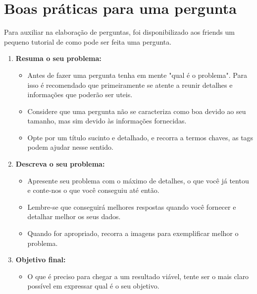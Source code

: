 \chapter{Boas práticas para uma pergunta}
\label{boa-pergunta}
 
Para auxiliar na elaboração de perguntas, foi disponibilizado aos \glspl{friend} um pequeno tutorial de como pode ser feita uma pergunta. 

\begin{enumerate}
\item \textbf{Resuma o seu problema:} 
\begin{itemize}
\item Antes de fazer uma pergunta tenha em mente "qual é o problema". Para isso é recomendado que primeiramente se atente a reunir detalhes e informações que poderão ser uteis.
\item Considere que uma pergunta não se caracteriza como boa devido ao seu tamanho, mas sim devido às informações fornecidas.
\item Opte por um título sucinto e detalhado, e recorra a termos chaves, as tags podem ajudar nesse sentido.
\end{itemize}
\item \textbf{Descreva o seu problema:}
\begin{itemize}
\item Apresente seu problema com o máximo de detalhes, o que você já tentou e conte-nos o que você conseguiu até então.
\item Lembre-se que conseguirá melhores respostas quando você fornecer e detalhar melhor os seus dados.
\item Quando for apropriado, recorra a imagens para exemplificar melhor o problema.
\end{itemize}
\item \textbf{Objetivo final:}
\begin{itemize}
\item O que é preciso para chegar a um resultado viável, tente ser o mais claro possível em expressar qual é o seu objetivo.
\end{itemize}

\end{enumerate}